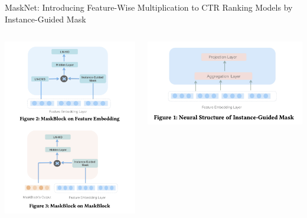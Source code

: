 \documentclass[11pt,aspectratio=169,handout]{beamer}
\begin{document}
\begin{frame}{MaskNet: Introducing Feature-Wise Multiplication to CTR Ranking Models by Instance-Guided Mask \cite{MASKNET}}

\begin{columns}
\begin{column}{0.45\textwidth} 
\begin{center}
\includegraphics[scale=0.25]{images/mask-block.png}
\end{center}
\end{column}
\begin{column}{0.45\textwidth}
\begin{center}
\includegraphics[scale=0.3]{images/mask-mask.png}
\end{center}
\end{column}
\end{columns}

\end{frame}
\end{document}
